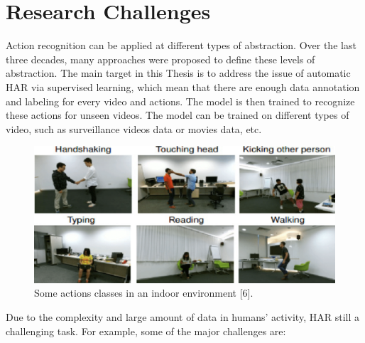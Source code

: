 \section{Research Challenges}
\hspace{5mm} Action recognition can be applied at different types of abstraction. Over the last three decades, many approaches were proposed to define these levels of abstraction. The main target in this Thesis is to address the issue of automatic HAR via supervised learning, which mean that there are enough data annotation and labeling for every video and actions. The model is then trained to recognize these actions for unseen videos. The model can be trained on different types of video, such as surveillance videos data or movies data, etc.
\begin{figure}[ht]
\centering
\includegraphics{Chapters/ti}
\decoRule
\caption[Some actions classes in an indoor environment "6"]{Some actions classes in an indoor environment [6].}
\label{fig:la}
\end{figure}
Due to the complexity and large amount of data in humans’ activity, HAR still a challenging task. For example, some of the major challenges are:
